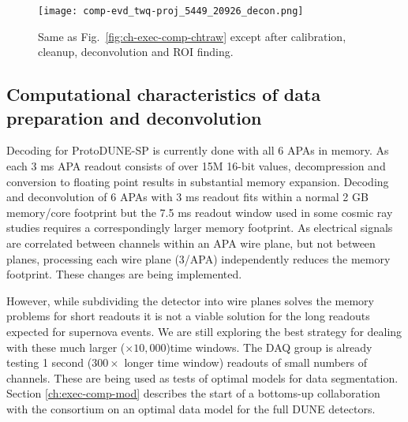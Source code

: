 
\begin{figure}[t]
  \texttt{[image: comp-evd\_twq-proj\_5449\_20926\_decon.png]}
\caption{
Same as Fig.~\ref{fig:ch-exec-comp-chtraw} except after calibration, cleanup, deconvolution and ROI finding. 
}
\label{fig:ch-exec-comp-chtroi}
\end{figure}


\subsection{Computational characteristics of data preparation and deconvolution }
Decoding for ProtoDUNE-SP is currently done with all 6 APAs in memory. As each 3 ms APA readout consists of over 15M 16-bit values, decompression and conversion to floating point results in substantial memory expansion.  Decoding and deconvolution of 6 APAs with 3 ms readout fits within a normal 2 GB memory/core footprint but the 7.5 ms readout window used in some cosmic ray studies requires a correspondingly larger memory footprint. As electrical signals are correlated between channels within an APA wire plane, but not between planes, processing each wire plane (3/APA) independently reduces the memory footprint.  These changes are being implemented.


However,  while subdividing the detector into wire planes solves the memory problems for short readouts it is  not a viable solution for the long readouts expected for supernova events. We are still exploring the best strategy for dealing with these much larger ($\times 10,000$)time windows. The DAQ group is already testing 1 second ($300 \times$ longer time window) readouts of small numbers of channels.  These are being used as tests of optimal models for data segmentation.  Section \ref{ch:exec-comp-mod} describes the start of a bottoms-up collaboration with the  consortium on an optimal data model for the full DUNE detectors. 

